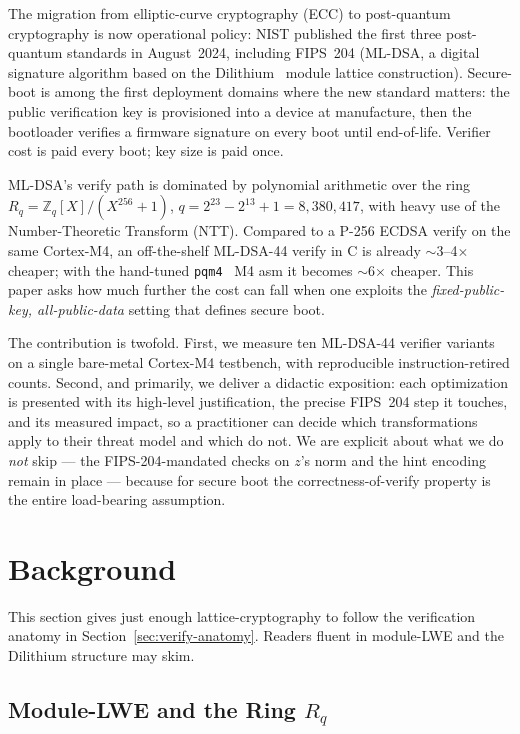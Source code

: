 \documentclass[11pt,a4paper]{article}
\newcommand{\Z}{\mathbb{Z}}
\newcommand{\Zq}{\Z_q}
\newcommand{\Rq}{R_q}
\begin{document}
The migration from elliptic-curve cryptography (ECC) to post-quantum
cryptography is now operational policy: NIST published the first three
post-quantum standards in August~2024, including FIPS~204 (ML-DSA, a
digital signature algorithm based on the Dilithium~\cite{dilithium} module
lattice construction). Secure-boot is among the first deployment domains
where the new standard matters: the public verification key is provisioned
into a device at manufacture, then the bootloader verifies a firmware
signature on every boot until end-of-life. Verifier cost is paid every
boot; key size is paid once.

ML-DSA's verify path is dominated by polynomial arithmetic over the ring
$\Rq = \Zq[X]/(X^{256}+1)$, $q = 2^{23} - 2^{13} + 1 = 8{,}380{,}417$, with
heavy use of the Number-Theoretic Transform (NTT). Compared to a
P-256 ECDSA verify on the same Cortex-M4, an off-the-shelf ML-DSA-44
verify in C is already $\sim$3--4$\times$ cheaper; with the hand-tuned
\texttt{pqm4}~\cite{pqm4} M4 asm it becomes $\sim$6$\times$ cheaper. This
paper asks how much further the cost can fall when one exploits the
\emph{fixed-public-key, all-public-data} setting that defines secure boot.

The contribution is twofold. First, we measure ten ML-DSA-44 verifier
variants on a single bare-metal Cortex-M4 testbench, with reproducible
instruction-retired counts. Second, and primarily, we deliver a didactic
exposition: each optimization is presented with its high-level
justification, the precise FIPS~204 step it touches, and its measured
impact, so a practitioner can decide which transformations apply to their
threat model and which do not. We are explicit about what we do
\emph{not} skip --- the FIPS-204-mandated checks on $z$'s norm and the
hint encoding remain in place --- because for secure boot the
correctness-of-verify property is the entire load-bearing assumption.

\section{Background}
\label{sec:background}

This section gives just enough lattice-cryptography to follow the
verification anatomy in Section~\ref{sec:verify-anatomy}. Readers fluent
in module-LWE and the Dilithium structure may skim.

\subsection{Module-LWE and the Ring \texorpdfstring{$\Rq$}{Rq}}
\end{document}
